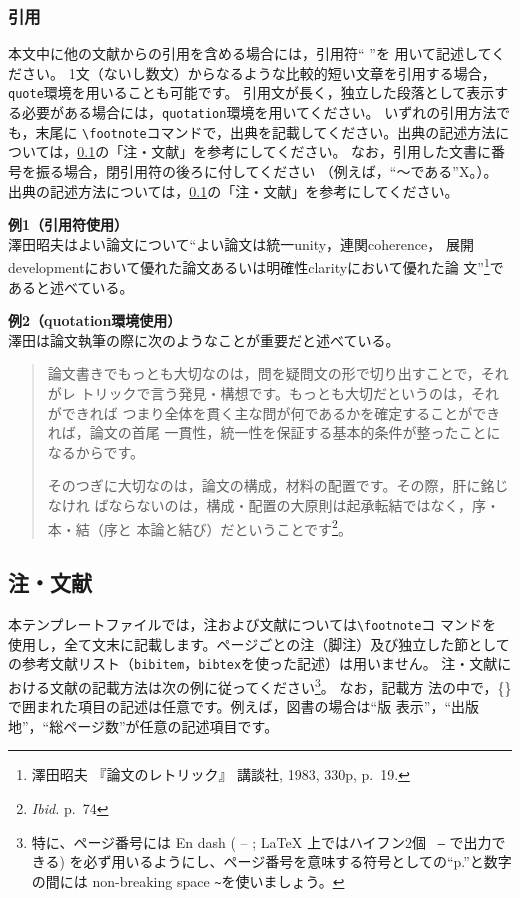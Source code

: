 \documentclass[b5paper,10pt,twocolumn,tombow]{jarticle}
\begin{document}
\subsubsection{引用}
本文中に他の文献からの引用を含める場合には，引用符`` ''を
用いて記述してください。
1文（ないし数文）からなるような比較的短い文章を引用する場合，\texttt{quote}環境を用いることも可能です。
引用文が長く，独立した段落として表示する必要がある場合には，\texttt{quotation}環境を用いてください。
いずれの引用方法でも，末尾に
\verb|\footnote|コマンドで，出典を記載してください。出典の記述方法に
ついては，\ref{123950_27Oct08}の「注・文献」を参考にしてください。
なお，引用した文書に番号を振る場合，閉引用符の後ろに付してください
（例えば，``～である''X。）。
出典の記述方法については，\ref{123950_27Oct08}の「注・文献」を参考にしてください。

\noindent{}\textbf{例1（引用符使用）}\\
澤田昭夫はよい論文について``よい論文は統一unity，連関coherence，
展開developmentにおいて優れた論文あるいは明確性clarityにおいて優れた論
文''\footnote{澤田昭夫 『論文のレトリック』 講談社, 1983, 330p, p.~19.}であると述べている。

\noindent{}\textbf{例2（quotation環境使用）}\\
澤田は論文執筆の際に次のようなことが重要だと述べている。
\begin{quotation}
  論文書きでもっとも大切なのは，問を疑問文の形で切り出すことで，それがレ
  トリックで言う発見・構想です。もっとも大切だというのは，それができれば
  つまり全体を貫く主な問が何であるかを確定することができれば，論文の首尾
  一貫性，統一性を保証する基本的条件が整ったことになるからです。

  そのつぎに大切なのは，論文の構成，材料の配置です。その際，肝に銘じなけれ
  ばならないのは，構成・配置の大原則は起承転結ではなく，序・本・結（序と
  本論と結び）だということです\footnote{\textit{Ibid.} p.~74}。
\end{quotation}


\subsection{注・文献} \label{123950_27Oct08}
本テンプレートファイルでは，注および文献については\verb|\footnote|コ
マンドを
使用し，全て文末に記載します。ページごとの注（脚注）及び独立した節としての参考文献リスト（\texttt{bibitem}，\texttt{bibtex}を使った記述）は用いません。
注・文献における文献の記載方法は次の例に従ってください\footnote{特に、ページ番号には En dash ( -- ; \LaTeX{} 上ではハイフン2個 \texttt{ --} で出力できる) を必ず用いるようにし、ページ番号を意味する符号としての``p.''と数字の間には non-breaking space \texttt{\~}を使いましょう。}。
なお，記載方
法の中で，\{\}で囲まれた項目の記述は任意です。例えば，図書の場合は``版
表示''，``出版地''，``総ページ数''が任意の記述項目です。
\end{document}
